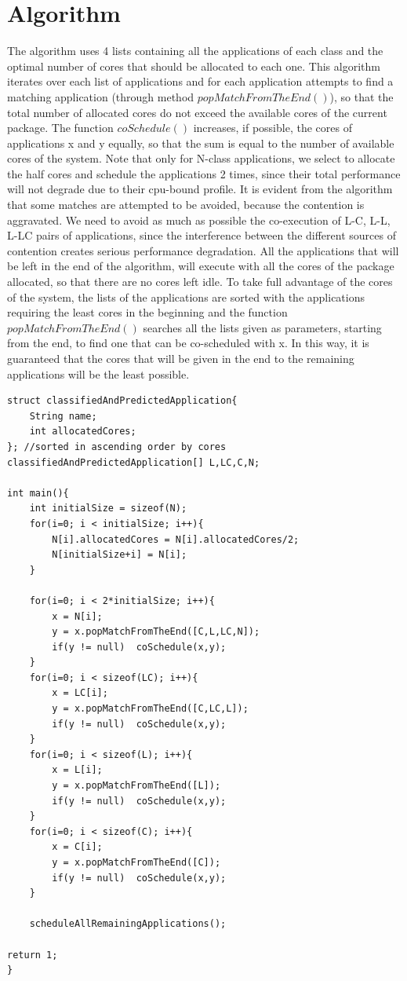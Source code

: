 \documentclass[diploma]{Styles/softlab-thesis}
\begin{document}
\section{Algorithm}

The algorithm uses 4 lists containing all the applications of each class and the optimal number of cores that should be allocated to each one. This algorithm iterates over each list of applications and for each application attempts to find a matching application (through method $popMatchFromTheEnd()$), so that the total number of allocated cores do not exceed the available cores of the current package. The function $coSchedule()$ increases, if possible, the cores of applications x and y equally, so that the sum is equal to the number of available cores of the system. Note that only for N-class applications, we select to allocate the half cores and schedule the applications 2 times, since their total performance will not degrade due to their cpu-bound profile. It is evident from the algorithm that some matches are attempted to be avoided, because the contention is aggravated. We need to avoid as much as possible the co-execution of L-C, L-L, L-LC pairs of applications, since the interference between the different sources of contention creates serious performance degradation. All the applications that will be left in the end of the algorithm, will execute with all the cores of the package allocated, so that there are no cores left idle. To take full advantage of the cores of the system, the lists of the applications are sorted with the applications requiring the least cores in the beginning and the function $popMatchFromTheEnd()$ searches all the lists given as parameters, starting from the end, to find one that can be co-scheduled with x. In this way, it is guaranteed that the cores that will be given in the end to the remaining applications will be the least possible.

\begin{Verbatim}[samepage=true, frame=single]
struct classifiedAndPredictedApplication{
    String name;
    int allocatedCores;
}; //sorted in ascending order by cores
classifiedAndPredictedApplication[] L,LC,C,N;

int main(){
    int initialSize = sizeof(N);
    for(i=0; i < initialSize; i++){
        N[i].allocatedCores = N[i].allocatedCores/2;
        N[initialSize+i] = N[i];
    }

    for(i=0; i < 2*initialSize; i++){                  
        x = N[i];
        y = x.popMatchFromTheEnd([C,L,LC,N]);
        if(y != null)  coSchedule(x,y);
    }
    for(i=0; i < sizeof(LC); i++){              
        x = LC[i];
        y = x.popMatchFromTheEnd([C,LC,L]);
        if(y != null)  coSchedule(x,y);
    }
    for(i=0; i < sizeof(L); i++){              
        x = L[i];
        y = x.popMatchFromTheEnd([L]);
        if(y != null)  coSchedule(x,y);
    }
    for(i=0; i < sizeof(C); i++){              
        x = C[i];
        y = x.popMatchFromTheEnd([C]);
        if(y != null)  coSchedule(x,y);
    }

    scheduleAllRemainingApplications();

return 1;
}


\end{Verbatim}
\end{document}
